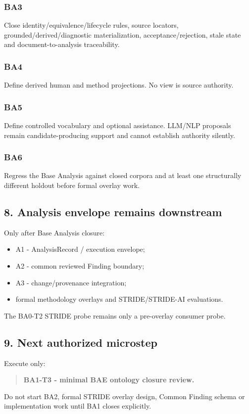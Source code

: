 \documentclass[
  10pt,
]{article}
\providecommand{\tightlist}{%
  \setlength{\itemsep}{0pt}\setlength{\parskip}{0pt}}
\begin{document}
\subsubsection{BA3}\label{ba3}

Close identity/equivalence/lifecycle rules, source locators,
grounded/derived/diagnostic materialization, acceptance/rejection, stale
state and document-to-analysis traceability.

\subsubsection{BA4}\label{ba4}

Define derived human and method projections. No view is source
authority.

\subsubsection{BA5}\label{ba5}

Define controlled vocabulary and optional assistance. LLM/NLP proposals
remain candidate-producing support and cannot establish authority
silently.

\subsubsection{BA6}\label{ba6}

Regress the Base Analysis against closed corpora and at least one
structurally different holdout before formal overlay work.

\subsection{8. Analysis envelope remains
downstream}\label{analysis-envelope-remains-downstream}

Only after Base Analysis closure:

\begin{itemize}
\tightlist
\item
  A1 - AnalysisRecord / execution envelope;
\item
  A2 - common reviewed Finding boundary;
\item
  A3 - change/provenance integration;
\item
  formal methodology overlays and STRIDE/STRIDE-AI evaluations.
\end{itemize}

The BA0-T2 STRIDE probe remains only a pre-overlay consumer probe.

\subsection{9. Next authorized
microstep}\label{next-authorized-microstep}

Execute only:

\begin{quote}
\textbf{BA1-T3 - minimal BAE ontology closure review.}
\end{quote}

Do not start BA2, formal STRIDE overlay design, Common Finding schema or
implementation work until BA1 closes explicitly.
\end{document}
